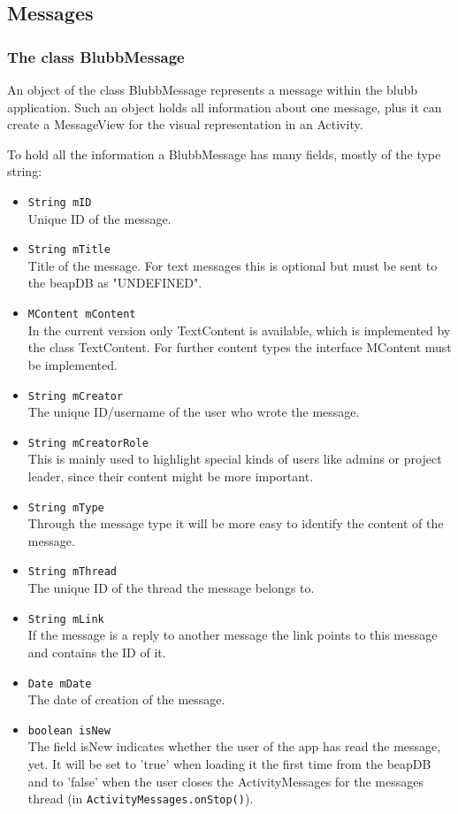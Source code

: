 \documentclass[12pt,a4paper,oneside]{report}
\newcommand{\appname}{blubb}
\newcommand{\beapDB}{beapDB}
\newcommand{\code}[1]{\lstinline{#1}}
\begin{document}
\subsection{Messages}
\subsubsection{The class BlubbMessage}
An object of the class BlubbMessage represents a message within the \appname{} application. Such an object holds all information about one message, plus it can create a MessageView for the visual representation in an Activity. 

To hold all the information a BlubbMessage has many fields, mostly of the type string: 
\begin{itemize}
\item \code{String mID}\\
Unique ID of the message.
\item \code{String mTitle}\\
Title of the message. For text messages this is optional but must be sent to the \beapDB{} as "UNDEFINED".
\item \code{MContent mContent}\\
In the current version only TextContent is available, which is implemented by the class TextContent. For further content types the interface MContent must be implemented. 
\item \code{String mCreator}\\
The unique ID/username of the user who wrote the message.
\item \code{String mCreatorRole}\\
This is mainly used to highlight special kinds of users like admins or project leader, since their content might be more important.
\item \code{String mType}\\
Through the message type it will be more easy to identify the content of the message.
\item \code{String mThread}\\
The unique ID of the thread the message belongs to.
\item \code{String mLink}\\
If the message is a reply to another message the link points to this message and contains the ID of it.
\item \code{Date mDate}\\
The date of creation of the message. 
\item \code{boolean isNew}\\
The field isNew indicates whether the user of the app has read the message, yet. It will be set to 'true' when loading it the first time from the \beapDB{} and to 'false' when the user closes the ActivityMessages for the messages thread (in \code{ActivityMessages.onStop()}). 

\end{itemize}
\end{document}
